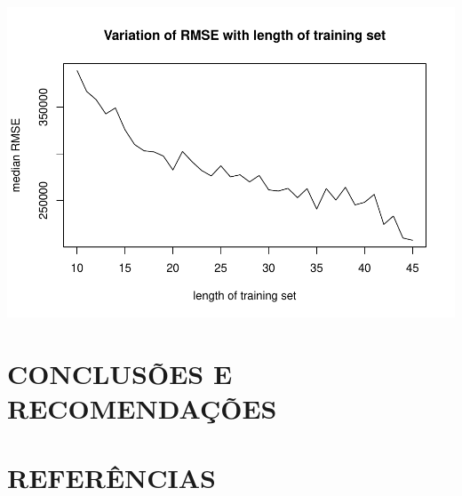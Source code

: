 \documentclass[a4paper, 12pt]{article}
\begin{document}
\includegraphics{Artigo_files/figure-latex/unnamed-chunk-6-1.pdf}

\section{CONCLUSÕES E RECOMENDAÇÕES}\label{conclusoes-e-recomendacoes}

\section{REFERÊNCIAS}\label{referencias}
\end{document}
